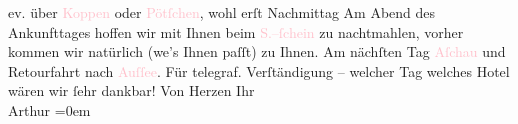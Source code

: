                ev. über \textcolor{pink}{Koppen}{}\ledrightnote{\textcolor{pink}{Hoher Koppen}} oder \textcolor{pink}{Pötſchen}{}\ledrightnote{\textcolor{pink}{Pötschenpass}}, wohl erſt Nachmittag\pend
           \pstart
           Am Abend des Ankunfttages
               hoffen wir mit Ihnen beim \textcolor{pink}{S.–ſchein}{}\ledrightnote{\textcolor{pink}{Restaurant Sonnenschein}} zu
               nachtmahlen, vorher kommen wir natürlich (we{\geminationn}’s Ihnen
               paſſt) zu Ihnen. Am nächſten Tag \textcolor{pink}{Aſchau}{}\ledrightnote{\textcolor{pink}{Aschau}} und
               Retourfahrt nach \textcolor{pink}{Auſſee}{}\ledrightnote{\textcolor{pink}{Bad Aussee}}. Für telegraf. Verſtändigung
               – welcher Tag welches Hotel wären wir ſehr dankbar!\pend
           \pstart
           Von Herzen Ihr{\\[\baselineskip]}\spacefill\mbox{Arthur}\pend
           \leftskip=0em{}\endnumbering{}  
      